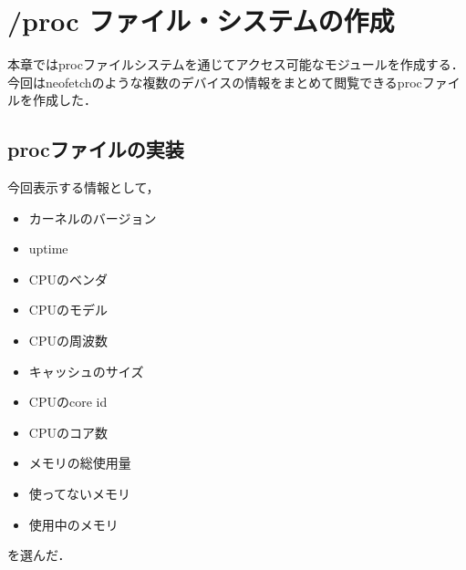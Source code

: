 \chapter{/proc ファイル・システムの作成}
本章ではprocファイルシステムを通じてアクセス可能なモジュールを作成する．
今回はneofetch\cite{neofetch}のような複数のデバイスの情報をまとめて閲覧できるprocファイルを作成した．

\section{procファイルの実装}
今回表示する情報として，
\begin{itemize}
    \item カーネルのバージョン
    \item uptime
    \item CPUのベンダ
    \item CPUのモデル
    \item CPUの周波数
    \item キャッシュのサイズ
    \item CPUのcore id
    \item CPUのコア数
    \item メモリの総使用量
    \item 使ってないメモリ
    \item 使用中のメモリ
\end{itemize}
を選んだ．

